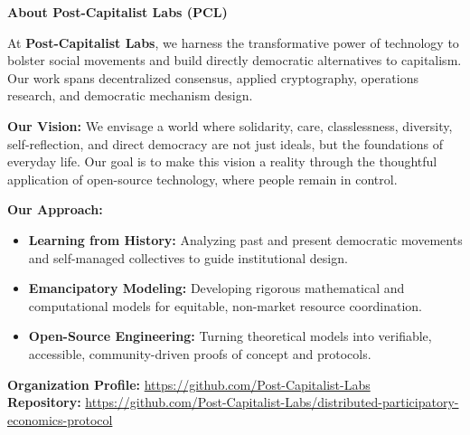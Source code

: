 \documentclass[10pt,twoside,openany]{book}
\theoremstyle{dpepstyle}
\begin{document}
\noindent\colorbox{SoftBg}{%
  \parbox{\dimexpr\textwidth-2\fboxsep\relax}{%
    \vspace{6pt}
    {\normalsize\bfseries\color{NavyPrimary} About Post-Capitalist Labs (PCL)}\par\vspace{4pt}
    {\small\color{SlateDark}
    At \textbf{Post-Capitalist Labs}, we harness the transformative power of technology to bolster social movements and build directly democratic alternatives to capitalism. Our work spans decentralized consensus, applied cryptography, operations research, and democratic mechanism design.\par\vspace{4pt}
    \textbf{Our Vision:} We envisage a world where solidarity, care, classlessness, diversity, self-reflection, and direct democracy are not just ideals, but the foundations of everyday life. Our goal is to make this vision a reality through the thoughtful application of open-source technology, where people remain in control.\par\vspace{4pt}
    \textbf{Our Approach:}
    \begin{itemize}[leftmargin=1.5em,itemsep=2pt,topsep=2pt]
      \item \textbf{Learning from History:} Analyzing past and present democratic movements and self-managed collectives to guide institutional design.
      \item \textbf{Emancipatory Modeling:} Developing rigorous mathematical and computational models for equitable, non-market resource coordination.
      \item \textbf{Open-Source Engineering:} Turning theoretical models into verifiable, accessible, community-driven proofs of concept and protocols.
    \end{itemize}
    \vspace{2pt}
    \textbf{Organization Profile:} \url{https://github.com/Post-Capitalist-Labs}\\
    \textbf{Repository:} \url{https://github.com/Post-Capitalist-Labs/distributed-participatory-economics-protocol}}
    \vspace{6pt}
  }%
}

\clearpage
\end{document}
